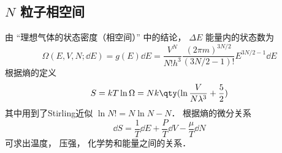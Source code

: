
\subsection{$N$ 粒子相空间}

由 “理想气体的状态密度（相空间）” 中的结论， $\Delta E$ 能量内的状态数为
\begin{equation}
\Omega (E,V,N; \dd{E}) = g(E)\dd{E} = \frac{V^N}{N! h^3}\frac{(2\pi m)^{3N/2}}{(3N/2-1)!}E^{3N/2 - 1} \dd{E}
\end{equation}
根据熵的定义%
\begin{equation}
S = kT\ln \Omega  = Nk \qty(\ln \frac{V}{N\lambda^3} + \frac52)
\end{equation}
其中用到了Stirling近似%
$\ln N! = N\ln N - N$． 根据熵的微分关系
\begin{equation}
\dd{S} = \frac{1}{T} \dd{E} + \frac{P}{T} \dd{V} - \frac{\mu}{T} \dd{N}
\end{equation}
可求出温度， 压强， 化学势和能量之间的关系．
